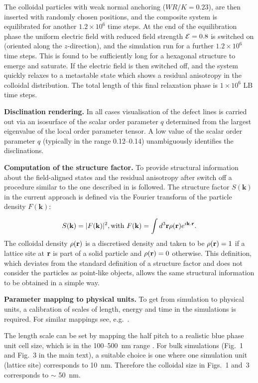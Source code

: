 \documentclass[12pt]{article}
\begin{document}
The colloidal particles with weak
normal anchoring ($WR / K= 0.23$), are then inserted with randomly chosen positions,
and the composite system is equilibrated for another $1.2\times10^{6}$
time steps.
At the end of the equilibration phase the uniform electric field
with reduced field strength ${\cal E} = 0.8$ 
is switched on (oriented along the $z$-direction), and the simulation
run for a further $1.2\times10^{6}$ time steps.
This is found to be sufficiently long for a hexagonal structure to
emerge and saturate.
If the electric field is then switched off, and the system quickly relaxes
to a metastable state which shows a residual anisotropy in the
colloidal distribution. The total length of this final relaxation phase
is $1\times10^6$ LB time steps.

\medskip
\noindent
\textbf{Disclination rendering.}
In all cases visualisation of the defect lines is carried out via
an isosurface of the scalar order parameter $q$ determined from the
largest eigenvalue of the local order parameter tensor. A low value
of the scalar order parameter $q$ (typically in the range 0.12--0.14)
unambiguously identifies the disclinations.

\medskip
\noindent
\textbf{Computation of the structure factor.}
To provide structural information about the field-aligned 
states and the residual anisotropy after switch off a 
procedure similar to the one described in \cite{bp3} is
followed.
The structure factor $S(\mathbf{k})$ in the current approach is
defined via the Fourier transform of the particle density $F(\mathbf{k})$:

\begin{equation}
S({\bf k}) =  |F({\bf k})|^2, \mathrm{with}\
F({\bf k}) = \int d^3{\bf r} \rho({\bf r}) e^{i {\bf k. r}}.
\end{equation}
The colloidal density $\rho({\bf r})$ is a discretised density and taken to be
$\rho({\bf r})=1$ if a lattice site at ${\bf r}$ is part of a solid particle
and $\rho({\bf r})=0$ otherwise. This definition, which deviates from the 
standard definition of a structure factor and does not consider the particles 
as point-like objects, allows the same structural information
to be obtained in a simple way.

\medskip
\noindent
\textbf{Parameter mapping to physical units.}
To get from simulation to physical units, a calibration of scales of
length, energy and time in the simulations is required. For similar
mappings see, e.g.~\cite{denniston2}.

The length scale can be set by mapping the half pitch to a realistic blue
phase unit cell size, which is in the 100--500~nm range \cite{mermin}. 
For bulk simulations (Fig.~1 and Fig.~3 in the main text), a suitable choice
is one where one simulation unit (lattice site) corresponds to 10~nm. Therefore
the colloidal size in Figs.~1 and~3 corresponds to $\sim$ 50~nm. 
\end{document}
